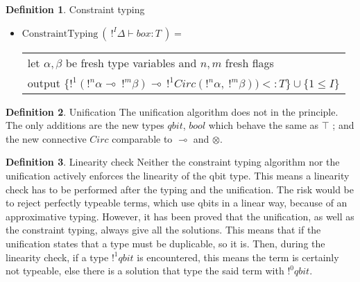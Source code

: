 \documentclass[10pt]{article}
\theoremstyle{plain}
\theoremstyle{definition}
\newtheorem{defn}{Definition}[subsection] %
\begin{document}
\begin{defn}{Constraint typing}
\begin{itemize}
		\item $\text{ConstraintTyping} ~ (~ !^I \Delta \vdash box : T ~) = $ \\
		  \begin{tabular}{l}
		  	let $\alpha, \beta$ be fresh type variables and $n, m$ fresh flags \\
				output $\{!^1(!^n\alpha \multimap ~!^m\beta) \multimap \,!^1Circ (!^n\alpha, ~!^m\beta)) <: T \} \cup \{ 1 \le I \}$
		  \end{tabular}
	\end{itemize}
\end{defn}

\begin{defn}{Unification}
	The unification algorithm does not in the principle. The only additions are the new types $qbit$, $bool$ which behave the same
	as $\top$ ; and the new connective $Circ$ comparable to $\multimap$ and $\otimes$.
\end{defn}

\begin{defn}{Linearity check} Neither the constraint typing algorithm nor the unification actively enforces the linearity of the qbit type.
	This means a linearity check has to be performed after the typing and the unification. The risk would be to reject
	perfectly typeable terms, which use qbits in a linear way, because of an approximative typing. However, it has been proved that
	the unification, as well as the constraint typing, always give all the solutions. This means that if the unification states that
	a type must be duplicable, so it is. Then, during the linearity check, if a type $!^1 qbit$ is encountered, this means the term is
	certainly not typeable, else there is a solution that type the said term with $!^0 qbit$.

\end{defn}
\end{document}
